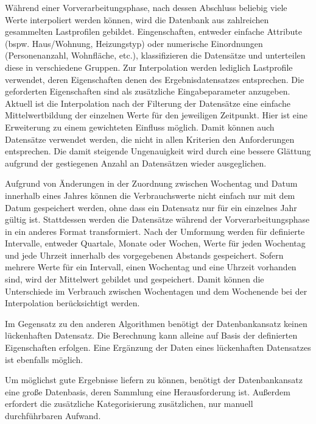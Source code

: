 Während einer Vorverarbeitungsphase, nach dessen Abschluss beliebig viele Werte interpoliert werden können, wird die Datenbank aus zahlreichen gesammelten Lastprofilen gebildet. Eingenschaften, entweder einfache Attribute (bspw. Haus/Wohnung, Heizungstyp) oder numerische Einordnungen (Personenanzahl, Wohnfläche, etc.), klassifizieren die Datensätze und unterteilen diese in verschiedene Gruppen.
Zur Interpolation werden lediglich Lastprofile verwendet, deren Eigenschaften denen des Ergebnisdatensatzes entsprechen. Die geforderten Eigenschaften sind als zusätzliche Eingabeparameter anzugeben.
Aktuell ist die Interpolation nach der Filterung der Datensätze eine einfache Mittelwertbildung der einzelnen Werte für den jeweiligen Zeitpunkt. Hier ist eine Erweiterung zu einem gewichteten Einfluss möglich. Damit können auch Datensätze verwendet werden, die nicht in allen Kriterien den Anforderungen entsprechen. Die damit steigende Ungenauigkeit wird durch eine bessere Glättung aufgrund der gestiegenen Anzahl an Datensätzen wieder ausgeglichen.

Aufgrund von Änderungen in der Zuordnung zwischen Wochentag und Datum innerhalb eines Jahres können die Verbrauchswerte nicht einfach nur mit dem Datum gespeichert werden, ohne dass ein Datensatz nur für ein einzelnes Jahr gültig ist. Stattdessen werden die Datensätze während der Vorverarbeitungsphase in ein anderes Format transformiert. Nach der Umformung werden für definierte Intervalle, entweder Quartale, Monate oder Wochen, Werte für jeden Wochentag und jede Uhrzeit innerhalb des vorgegebenen Abstands gespeichert. Sofern mehrere Werte für ein Intervall, einen Wochentag und eine Uhrzeit vorhanden sind, wird der Mittelwert gebildet und gespeichert. Damit können die Unterschiede im Verbrauch zwischen Wochentagen und dem Wochenende bei der Interpolation berücksichtigt werden.

Im Gegensatz zu den anderen Algorithmen benötigt der Datenbankansatz keinen lückenhaften Datensatz. Die Berechnung kann alleine auf Basis der definierten Eigenschaften erfolgen. Eine Ergänzung der Daten eines lückenhaften Datensatzes ist ebenfalls möglich.

Um möglichst gute Ergebnisse liefern zu können, benötigt der Datenbankansatz eine große Datenbasis, deren Sammlung eine Herausforderung ist. Außerdem erfordert die zusätzliche Kategorisierung zusätzlichen, nur manuell durchführbaren Aufwand.